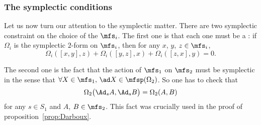 \subsubsection*{The symplectic conditions}

Let us now turn our attention to the symplectic matter. There are two symplectic constraint on the choice of the $\mfs_i$. The first one is that each one must be a : if $\Omega_i$ is the symplectic $2$-form on $\mfs_i$, then for any $x$, $y$, $z\in\mfs_i$,
\begin{equation}\label{eq:symple_Lie}
\Omega_i([x,y],z)+\Omega_i([y,z],x)+\Omega_i([z,x],y)=0.
\end{equation}

The second one is the fact that the action of $\mfs_1$ on $\mfs_2$ must be symplectic in the sense that
$\forall X\in\mfs_1,\, \ad X\in\mfsp (\Omega_2)$. So one has to check that
\begin{equation}
   \Omega_2\big(  \Ad_s A,\Ad_s B   \big)=\Omega_2(A,B)
\end{equation}
for any $s\in S_1$ and $A$, $B\in\mfs_2$. This fact was crucially used in the proof of proposition~\ref{prop:Darboux}.

